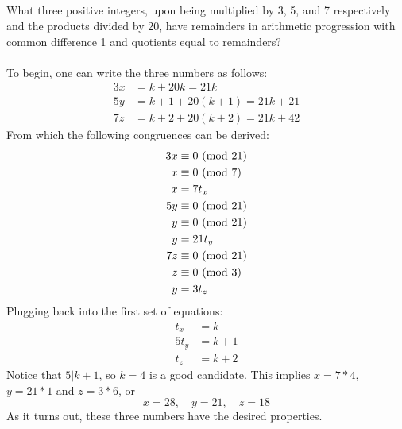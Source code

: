 \documentclass{article}
\begin{document}
\subsection{}
What three positive integers, upon being multiplied by 3, 5, and 7
respectively and the products divided by 20, have remainders in arithmetic
progression with common difference 1 and quotients equal to remainders?\\~\\
To begin, one can write the three numbers as follows:
\begin{align*}
    3x &= k + 20k = 21k\\
    5y &= k + 1 + 20(k + 1) = 21k + 21\\
    7z &= k + 2 + 20(k + 2) = 21k + 42
\end{align*}
From which the following congruences can be derived:
\begin{align*}
    3x &\equiv 0 \ (\mathrm{mod}\ 21)\\
    x &\equiv 0 \ (\mathrm{mod}\ 7)\\
    x &= 7t_x\\
    5y &\equiv 0 \ (\mathrm{mod}\ 21)\\
    y &\equiv 0 \ (\mathrm{mod}\ 21)\\
    y &= 21t_y\\
    7z &\equiv 0 \ (\mathrm{mod}\ 21)\\
    z &\equiv 0 \ (\mathrm{mod}\ 3)\\
    y &= 3t_z
\end{align*}
Plugging back into the first set of equations:
\begin{align*}
    t_x &= k\\
    5t_y &= k + 1\\
    t_z &= k + 2
\end{align*}
Notice that $5|k + 1$, so $k = 4$ is a good candidate.
This implies $x = 7 * 4$, $y = 21 * 1$ and $z = 3 * 6$, or
\begin{equation*}
    x = 28, \quad y = 21, \quad z = 18
\end{equation*}
As it turns out, these three numbers have the desired properties.

\end{document}
